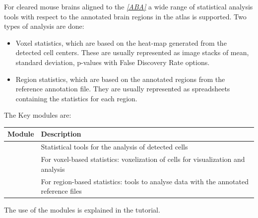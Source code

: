 \documentclass[letterpaper,10pt,english]{sphinxmanual}
\begin{document}
For cleared mouse brains aligned to the \label{introduction:id5}{\hyperref[introduction:aba]{\emph{{[}ABA{]}}}} a wide range of statistical
analysis tools with respect to the annotated brain regions in the atlas is
supported. Two types of analysis are done:
\begin{itemize}
\item {} 
Voxel statistics, which are based on the heat-map generated from the detected cell centers. These are usually represented as image stacks of mean, standard deviation, p-values with False Discovery Rate options.

\item {} 
Region statistics, which are based on the annotated regions from the reference annotation file. They are usually represented as spreadsheets containing the statistics for each region.

\end{itemize}

The Key modules are:

\begin{tabulary}{\linewidth}{|L|L|}
\hline
\textsf{\relax 
Module
} & \textsf{\relax 
Description
}\\
\hline
{\hyperref[api/ClearMap.Analysis:module-ClearMap.Analysis.Statistics]{\emph{}}}
 & 
Statistical tools for the analysis of detected cells
\\
\hline
{\hyperref[api/ClearMap.Analysis:module-ClearMap.Analysis.Voxelization]{\emph{}}}
 & 
For voxel-based statistics: voxelization of cells for visualization and analysis
\\
\hline
{\hyperref[api/ClearMap.Analysis:module-ClearMap.Analysis.Label]{\emph{}}}
 & 
For region-based statistics: tools to analyse data with the annotated reference files
\\
\hline\end{tabulary}


The use of the modules is explained in the tutorial.
\end{document}
